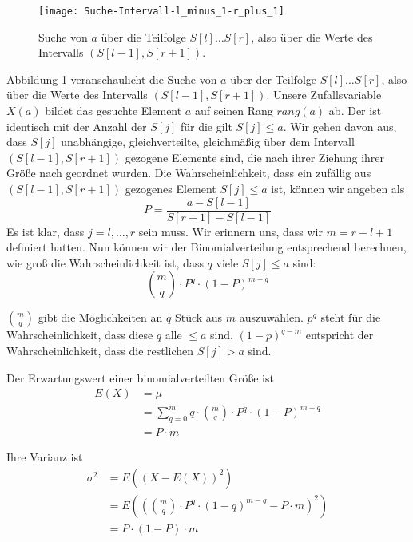 \begin{Lza}

\begin{figure}[hbt]
  \centering
  \texttt{[image: Suche-Intervall-l\_minus\_1-r\_plus\_1]}
  \caption{Suche von $a$ über die Teilfolge $S[l] \ldots S[r]$, also über die Werte des Intervalls $\left( S[l-1], S[r+1] \right)$. }
  \label{Suche_Intervall_lr}
\end{figure}

Abbildung \ref{Suche_Intervall_lr} veranschaulicht die Suche von $a$ über der Teilfolge $S[l] \ldots S[r]$, also über die Werte des Intervalls $\left( S[l-1], S[r+1] \right)$. Unsere Zufallsvariable $X(a)$ bildet das gesuchte Element $a$ auf seinen Rang $rang(a)$ ab. Der ist identisch mit der Anzahl der $S[j]$ für die gilt $S[j] \le a$. Wir gehen davon aus, dass $S[j]$ unabhängige, gleichverteilte, gleichmäßig über dem Intervall $(S[l-1], S[r+1])$ gezogene Elemente sind, die nach ihrer Ziehung ihrer Größe nach geordnet wurden. Die Wahrscheinlichkeit, dass ein zufällig aus $(S[l-1], S[r+1])$ gezogenes Element $S[j] \le a$ ist, können wir angeben als
\[ P = \frac{a - S[l-1]}{S[r+1] - S[l-1]} \]
Es ist klar, dass $j = l, \ldots, r$ sein muss. Wir erinnern uns, dass wir $m = r-l+1$ definiert hatten. Nun können wir der Binomialverteilung entsprechend berechnen, wie groß die Wahrscheinlichkeit ist, dass $q$ viele $S[j] \le a$ sind:
\[ \binom{m}{q} \cdot P^q \cdot (1-P)^{m-q} \]

$\binom{m}{q}$ gibt die Möglichkeiten an $q$ Stück aus $m$ auszuwählen. $p^q$ steht für die Wahrscheinlichkeit, dass diese $q$ alle $\le a$ sind. $(1-p)^{q-m}$ entspricht der Wahrscheinlichkeit, dass die restlichen $S[j] >a$ sind.

Der Erwartungswert einer binomialverteilten Größe ist
\begin{align*}
  E(X) &= \mu \\
       &= \sum_{q=0}^{m} q \cdot \binom{m}{q} \cdot P^q \cdot (1-P)^{m-q}\\
       &= P \cdot m
\end{align*}

Ihre Varianz ist
\begin{align*}
  \sigma^2 &= E((X-E(X))^2) \\
           &= E\left(\left(\binom{m}{q} \cdot P^q \cdot (1-q)^{m-q} - P \cdot m\right)^2\right) \\
           &= P \cdot (1-P) \cdot m
\end{align*}


\end{Lza}
